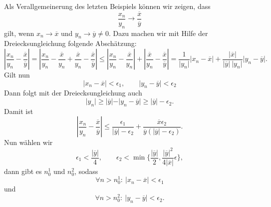 \documentclass[letterpaper,10pt,english]{jupyterBook}
\begin{document}
Als Verallgemeinerung des letzten Beispiels können wir zeigen, dass
\begin{equation*}
 \frac{x_n}{y_n} \rightarrow \frac{\overline{x}}{\overline{y}}\end{equation*}
gilt, wenn \(x_n \rightarrow \overline{x}\) und \(y_n \rightarrow \overline{y} \neq 0\). Dazu machen wir mit Hilfe der Dreiecksungleichung folgende Abschätzung:
\begin{equation*}
\left\vert \frac{x_n}{y_n} -\frac{\overline{x}}{\overline{y}} \right\vert =
\left\vert \frac{x_n}{y_n} -\frac{\overline{x}}{y_n}+\frac{\overline{x}}{y_n}-\frac{\overline{x}}{\overline{y}} \right\vert \leq 
\left\vert \frac{x_n}{y_n} -\frac{\overline{x}}{y_n}\right\vert+\left\vert\frac{\overline{x}}{y_n}-\frac{\overline{x}}{\overline{y}} \right\vert = \frac{1}{\vert y_n \vert} \vert x_n - \overline{x}\vert+
\frac{\vert \overline{x} \vert}{\vert \overline{y} \vert~\vert y_n \vert} \vert y_n - \overline{y}\vert.
\end{equation*}
Gilt nun
\begin{equation*}
  \vert x_n - \overline{x}\vert < \epsilon_1, \qquad  \vert y_n - \overline{y}\vert < \epsilon_2\end{equation*}
Dann folgt mit der Dreiecksungleichung auch
\begin{equation*}
 \vert y_n \vert \geq \vert \overline{y}\vert - \vert y_n - \overline{y}\vert \geq \vert \overline{y}\vert - \epsilon_2 .\end{equation*}
Damit ist
\begin{equation*}
 \left\vert \frac{x_n}{y_n} -\frac{\overline{x}}{\overline{y}} \right\vert \leq \frac{\epsilon_1}{\vert \overline{y} \vert - \epsilon_2} + \frac{\overline{x}\epsilon_2}{\overline{y}(\vert \overline{y} \vert - \epsilon_2)}  .\end{equation*}
Nun wählen wir
\begin{equation*}
 \epsilon_1 <\frac{\vert \overline{y} \vert }4,  \qquad \epsilon_2 < \min\{\frac{\vert \overline{y} \vert }2, \frac{\vert \overline{y} \vert^2}{4 \vert \overline{x} \vert} \epsilon \} ,\end{equation*}
dann gibt es \(n_0^1\) und \(n_0^2\), sodass
\begin{equation*}
 \forall n > n_0^1:~\vert x_n - \overline{x} \vert < \epsilon_1\end{equation*}
und
\begin{equation*}
 \forall n > n_0^2:~\vert y_n - \overline{y} \vert < \epsilon_2 .
\end{equation*}
\end{document}
